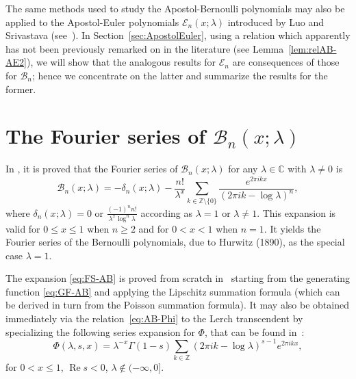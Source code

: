 \documentclass[11pt,a4paper]{amsart}
\newcommand{\Z}{\mathbb{Z}}
\newcommand{\C}{\mathbb{C}}
\newcommand{\B}{\mathcal{B}}
\newcommand{\E}{\mathcal{E}}
\renewcommand{\Re}{\operatorname{Re}}
\theoremstyle{plain}
\theoremstyle{remark}
\begin{document}
The same methods used to study the Apostol-Bernoulli polynomials may also be applied to the Apostol-Euler polynomials $\E_{n}(x;\lambda)$ introduced by Luo and Srivastava (see~\cite{Luo-Tai,LuoSri}). In Section~\ref{sec:ApostolEuler}, using a relation which apparently has not been previously remarked on in the literature (see Lemma~\ref{lem:relAB-AE2}), we will show that the analogous results for $\E_{n}$ are consequences of those for $\B_{n}$; hence we concentrate on the latter and summarize the results for the former. 




\section{The Fourier series of $\B_{n}(x;\lambda)$}
\label{sec:FourierSeriesAB}




In \cite[Theorem 2.1,\,p.~3]{Luo-MC}, it is proved that the Fourier series of $\B_n(x;\lambda)$ for any $\lambda \in \C$ with $\lambda \neq 0$ is
%
\begin{equation}
\label{eq:FS-AB}
  \B_n(x;\lambda) = -\delta_n(x;\lambda) - \frac{n!}{\lambda^x} \sum_{k \in \Z \setminus\{0\}} 
  \frac{e^{2\pi i k x}}{(2\pi i k - \log \lambda)^n},
\end{equation}
%
where $\delta_n(x;\lambda) = 0$ or $\frac{(-1)^n n!}{\lambda^x \log^n \lambda}$ according as $\lambda = 1$ or $\lambda \ne 1$. This expansion is valid for $0 \le x \le 1$ when $n \ge 2$ and for $0 < x < 1$ when $n = 1$. It yields the Fourier series of the Bernoulli polynomials, due to Hurwitz (1890), as the special case $\lambda = 1$.


The expansion \eqref{eq:FS-AB} is proved from scratch in~\cite{Luo-MC} starting from the generating function \eqref{eq:GF-AB} and applying the Lipschitz summation formula (which can be derived in turn from the Poisson summation formula). It may also be obtained immediately via the relation~\eqref{eq:AB-Phi} to the Lerch transcendent by specializing the following series expansion for $\Phi$, that can be found in~\cite[formula 1.11\,(6), p.~28]{Bate}:
%
\begin{equation}
\label{eq:AS-Lerch}
	\Phi(\lambda,s,x) = \lambda^{-x} \Gamma(1-s) \sum_{k \in \Z} (2\pi i k - \log \lambda)^{s-1} e^{2 \pi i k x},
\end{equation}
%
for $0 < x \leq 1$, $\Re s < 0$, $\lambda \notin (-\infty,0]$.
\end{document}
